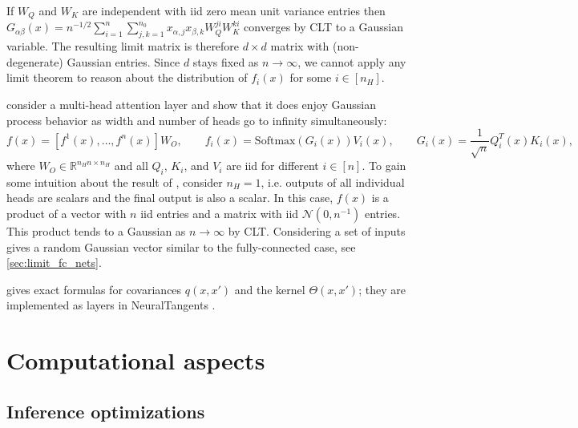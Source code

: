 \documentclass{article}
\newcommand{\RR}{\mathbb{R}}
\newcommand{\NN}{\mathcal{N}}
\begin{document}
    If $W_Q$ and $W_K$ are independent with iid zero mean unit variance entries then $G_{\alpha\beta}(x) = n^{-1/2} \sum_{i=1}^n \sum_{j,k=1}^{n_0} x_{\alpha,j} x_{\beta,k} W_Q^{ji} W_K^{ki}$ converges by CLT to a Gaussian variable.
    The resulting limit matrix is therefore $d \times d$ matrix with (non-degenerate) Gaussian entries.
    Since $d$ stays fixed as $n \to \infty$, we cannot apply any limit theorem to reason about the distribution of $f_i(x)$ for some $i \in [n_H]$.

    \cite{hron2020infinite} consider a multi-head attention layer and show that it does enjoy Gaussian process behavior as width and number of heads go to infinity simultaneously:
    \begin{equation}
        f(x)
        = [f^1(x), \ldots, f^n(x)] W_O,
        \qquad
        f_i(x)
        = \mathrm{Softmax}\left(G_i(x)\right) V_i(x),
        \qquad
        G_i(x)
        = \frac{1}{\sqrt{n}} Q_i^T(x) K_i(x),
    \end{equation}
    where $W_O \in \RR^{n_H n \times n_H}$ and all $Q_i$, $K_i$, and $V_i$ are iid for different $i \in [n]$.
    To gain some intuition about the result of \cite{hron2020infinite}, consider $n_H=1$, i.e. outputs of all individual heads are scalars and the final output is also a scalar.
    In this case, $f(x)$ is a product of a vector with $n$ iid entries and a matrix with iid $\NN(0,n^{-1})$ entries.
    This product tends to a Gaussian as $n \to \infty$ by CLT.
    Considering a set of inputs gives a random Gaussian vector similar to the fully-connected case, see \cref{sec:limit_fc_nets}.

    \cite{hron2020infinite} gives exact formulas for covariances $q(x,x')$ and the kernel $\Theta(x,x')$; they are implemented as layers in NeuralTangents \cite{novak2019neural}.


    \section{Computational aspects}
    \label{sec:computations}

    \subsection{Inference optimizations}
\end{document}
